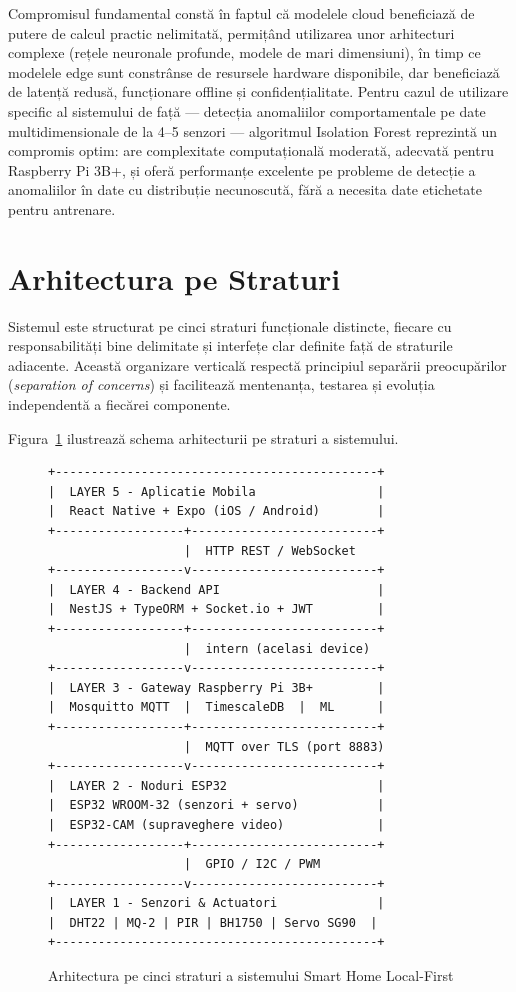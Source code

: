 \documentclass[12pt, twoside, a4paper]{report}
\begin{document}
Compromisul fundamental constă în faptul că modelele cloud beneficiază de putere
de calcul practic nelimitată, permițând utilizarea unor arhitecturi complexe (rețele
neuronale profunde, modele de mari dimensiuni), în timp ce modelele edge sunt
constrânse de resursele hardware disponibile, dar beneficiază de latență redusă,
funcționare offline și confidențialitate. Pentru cazul de utilizare specific al
sistemului de față --- detecția anomaliilor comportamentale pe date multidimensionale
de la 4--5 senzori --- algoritmul Isolation Forest reprezintă un compromis optim:
are complexitate computațională moderată, adecvată pentru Raspberry Pi 3B+, și
oferă performanțe excelente pe probleme de detecție a anomaliilor în date cu
distribuție necunoscută, fără a necesita date etichetate pentru antrenare.

\section{Arhitectura pe Straturi}

Sistemul este structurat pe cinci straturi funcționale distincte, fiecare cu
responsabilități bine delimitate și interfețe clar definite față de straturile adiacente.
Această organizare verticală respectă principiul separării preocupărilor
(\textit{separation of concerns}) și facilitează mentenanța, testarea și evoluția
independentă a fiecărei componente.

Figura~\ref{fig:arhitectura} ilustrează schema arhitecturii pe straturi a sistemului.

\begin{figure}[H]
\begin{center}
\begin{BVerbatim}[fontsize=\small]
+---------------------------------------------+
|  LAYER 5 - Aplicatie Mobila                 |
|  React Native + Expo (iOS / Android)        |
+------------------+--------------------------+
                   |  HTTP REST / WebSocket
+------------------v--------------------------+
|  LAYER 4 - Backend API                      |
|  NestJS + TypeORM + Socket.io + JWT         |
+------------------+--------------------------+
                   |  intern (acelasi device)
+------------------v--------------------------+
|  LAYER 3 - Gateway Raspberry Pi 3B+         |
|  Mosquitto MQTT  |  TimescaleDB  |  ML      |
+------------------+--------------------------+
                   |  MQTT over TLS (port 8883)
+------------------v--------------------------+
|  LAYER 2 - Noduri ESP32                     |
|  ESP32 WROOM-32 (senzori + servo)           |
|  ESP32-CAM (supraveghere video)             |
+------------------+--------------------------+
                   |  GPIO / I2C / PWM
+------------------v--------------------------+
|  LAYER 1 - Senzori & Actuatori              |
|  DHT22 | MQ-2 | PIR | BH1750 | Servo SG90  |
+---------------------------------------------+
\end{BVerbatim}
\end{center}
\caption{Arhitectura pe cinci straturi a sistemului Smart Home Local-First}
\label{fig:arhitectura}
\end{figure}
\end{document}
